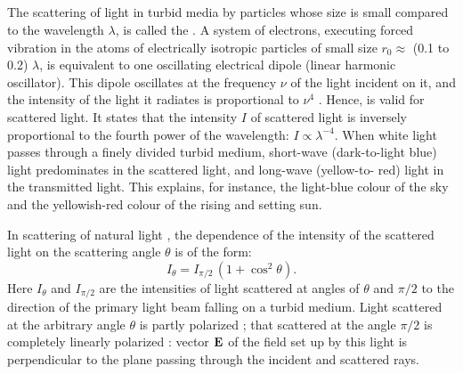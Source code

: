 \subsection{}\label{34.3.2} The scattering of light in turbid media by particles whose size is small compared to the wavelength $\lambda$, is called the . A system of electrons, executing forced vibration in the
atoms of electrically isotropic particles of small size $r_{0} \approx $ (0.1 to 0.2) $\lambda$, is equivalent to one oscillating electrical dipole (linear harmonic oscillator). This dipole oscillates at the frequency $\nu$ of the light incident on it, and the intensity of the light it
radiates is proportional to $\nu^{4}$ . Hence,  is valid for scattered light. It states that the intensity $I$ of scattered light is inversely proportional to the fourth power of the wavelength: $I \propto \lambda^{-4}$. When white light passes through a finely
divided turbid medium, short-wave (dark-to-light blue) light
predominates in the scattered light, and long-wave (yellow-to-
red) light in the transmitted light. This explains, for instance, the light-blue colour of the sky and the yellowish-red colour of the rising and setting sun.

In scattering of natural light , the dependence of the intensity of the scattered light on the scattering angle $\theta$ is of the form:
\begin{equation*}%
I_{\theta} = I_{\pi/2} \, (1 + \cos^{2} \theta).
\end{equation*}
Here $I_{\theta}$ and $I_{\pi/2}$ are the intensities of light scattered at angles of $\theta$ and $\pi/2$ to the direction of the primary light beam falling on a turbid medium. Light scattered at the arbitrary angle $\theta$ is partly polarized ; that scattered at the angle $\pi/2$ is
completely linearly polarized : vector $\vb{E}$ of the field set up by this light is perpendicular to the plane passing through the incident and scattered rays.

